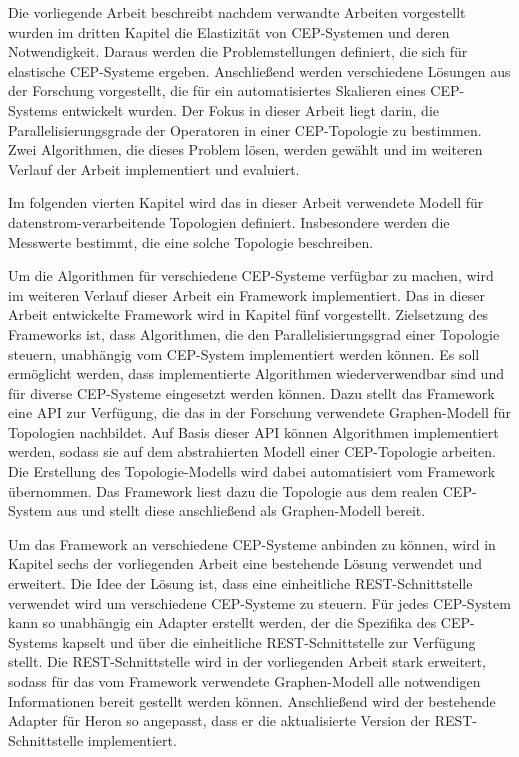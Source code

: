 Die vorliegende Arbeit beschreibt nachdem verwandte Arbeiten vorgestellt wurden im dritten Kapitel die Elastizität von CEP-Systemen und deren Notwendigkeit.
Daraus werden die Problemstellungen definiert, die sich für elastische CEP-Systeme ergeben.
Anschließend werden verschiedene Lösungen aus der Forschung vorgestellt, die für ein automatisiertes Skalieren eines CEP-Systems entwickelt wurden.
Der Fokus in dieser Arbeit liegt darin, die Parallelisierungsgrade der Operatoren in einer CEP-Topologie zu bestimmen.
Zwei Algorithmen, die dieses Problem lösen, werden gewählt und im weiteren Verlauf der Arbeit implementiert und evaluiert.

Im folgenden vierten Kapitel wird das in dieser Arbeit verwendete Modell für datenstrom-verarbeitende Topologien definiert.
Insbesondere werden die Messwerte bestimmt, die eine solche Topologie beschreiben.

Um die Algorithmen für verschiedene CEP-Systeme verfügbar zu machen, wird im weiteren Verlauf dieser Arbeit ein Framework implementiert.
Das in dieser Arbeit entwickelte Framework wird in Kapitel fünf vorgestellt.
Zielsetzung des Frameworks ist, dass Algorithmen, die den Parallelisierungsgrad einer Topologie steuern, unabhängig vom CEP-System implementiert werden können.
Es soll ermöglicht werden, dass implementierte Algorithmen wiederverwendbar sind und für diverse CEP-Systeme eingesetzt werden können.
Dazu stellt das Framework eine API zur Verfügung, die das in der Forschung verwendete Graphen-Modell für Topologien nachbildet.
Auf Basis dieser API können Algorithmen implementiert werden, sodass sie auf dem abstrahierten Modell einer CEP-Topologie arbeiten.
Die Erstellung des Topologie-Modells wird dabei automatisiert vom Framework übernommen.
Das Framework liest dazu die Topologie aus dem realen CEP-System aus und stellt diese anschließend als Graphen-Modell bereit. 

Um das Framework an verschiedene CEP-Systeme anbinden zu können, wird in Kapitel sechs der vorliegenden Arbeit eine bestehende Lösung \cite{goggel_vergleich_2018} verwendet und erweitert.
Die Idee der Lösung ist, dass eine einheitliche REST-Schnittstelle verwendet wird um verschiedene CEP-Systeme zu steuern.
Für jedes CEP-System kann so unabhängig ein Adapter erstellt werden, der die Spezifika des CEP-Systems kapselt und über die einheitliche REST-Schnittstelle zur Verfügung stellt.
Die REST-Schnittstelle wird in der vorliegenden Arbeit stark erweitert, sodass für das vom Framework verwendete Graphen-Modell alle notwendigen Informationen bereit gestellt werden können.
Anschließend wird der bestehende Adapter für Heron so angepasst, dass er die aktualisierte Version der REST-Schnittstelle implementiert.

